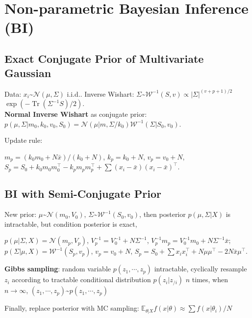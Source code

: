 \section{Non-parametric Bayesian Inference (BI)}

\subsection*{Exact Conjugate Prior of Multivariate Gaussian}
Data: $x_i$\textasciitilde$ \mathcal{N}(\mu,\Sigma)$ i.i.d.. Inverse Wishart: $\Sigma $\textasciitilde$ \mathcal{W}^{-1}(S, v) \propto |\Sigma|^{(v+p+1)/2}$ $\exp( - \operatorname{Tr}( \Sigma^{-1} S)/2 )$. \\
\textbf{Normal Inverse Wishart} as conjugate prior:\\ $p(\mu, \Sigma | m_0, k_0, v_0, S_0) = \mathcal{N}(\mu | m, \Sigma/k_0)\mathcal{W}^{-1}(\Sigma | S_0,v_0)$. 

Update rule: \begin{footnotesize}
    $m_p = (k_0 m_0+N\bar{x})/(k_0+N)$, $k_p = k_0 + N$, $v_p =v_0 + N$, $S_p =S_0 + k_0 m_0 m_0^{\top} - k_p m_p m_p^{\top} + \sum (x_i-\bar{x})(x_i-\bar{x})^{\top}$. 
\end{footnotesize}


\subsection*{BI with Semi-Conjugate Prior}
New prior: $\mu$\textasciitilde$ \mathcal{N}(m_0,V_0)$, $\Sigma $\textasciitilde$ \mathcal{W}^{-1}(S_0, v_0)$, then posterior $p(\mu,\Sigma | X)$ is intractable, but condition posterior is exact, \begin{footnotesize}
    $p(\mu | \Sigma, X) = \mathcal{N}(m_p,V_p)$, $V_p^{-1} = V_0^{-1} + N\Sigma^{-1}$, $V_p^{-1}m_p = V_0^{-1} m_0 + N\Sigma^{-1}\bar{x}$; $p(\Sigma | \mu, X) = \mathcal{W}^{-1}(S_p,v_p)$, $v_p = v_0 + N$, $S_p = S_0 +\sum x_ix_i^{\top} + N\mu\mu^{\top} - 2N\bar{x}\mu^{\top}$. 
\end{footnotesize}

\textbf{Gibbs sampling}: random variable $p(z_1,\cdots, z_p)$ intractable, cyclically resample $z_i$ according to tractable conditional distribution $p(z_i | z_{/i})$ $n$ times, when $n\to \infty$, $(z_1,\cdots, z_p)$\textasciitilde$ p(z_1,\cdots, z_p)$ 

Finally, replace posterior with MC sampling: $\mathbb{E}_{\theta | X} f(x| \theta) \approx \sum f(x| \theta_i) / N$

